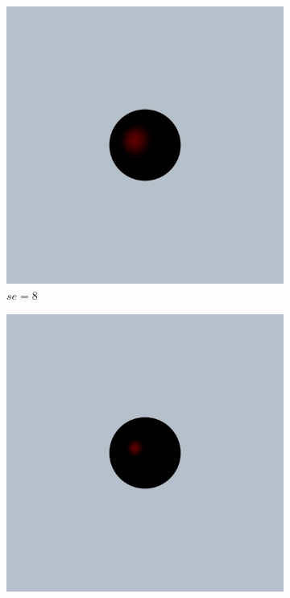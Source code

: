 \documentclass{article}
\begin{document}
\begin{figure}[h]
\begin{subfigure}{0.2\textwidth}
		\includegraphics[width=\textwidth]{specular_sc_0_08_se_8}
		\caption{$se = 8$}
		\label{fig:specular_0_08_8}
	\end{subfigure}%
	\hfill
	\begin{subfigure}{0.2\textwidth}
		\includegraphics[width=\textwidth]{specular_sc_0_08_se_32}

\end{subfigure}
\end{figure}
\end{document}
